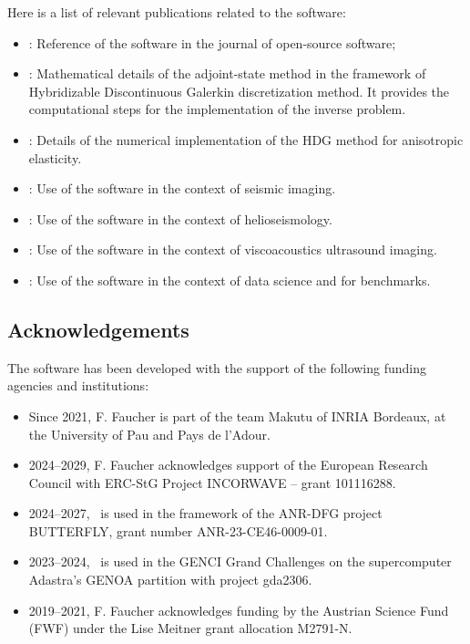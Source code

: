 Here is a list of relevant publications related to the software:
\begin{itemize}
\item \cite{faucher_hawen_2021}: Reference of the software in the journal of open-source software;
\item \cite{Faucher2020adjoint}:
      Mathematical details of the adjoint-state method in the framework 
      of Hybridizable Discontinuous Galerkin discretization method.
      It provides the computational steps for the implementation of the 
      inverse problem.
\item \cite{pham_numerical_2024}: Details of the numerical implementation 
      of the HDG method for anisotropic elasticity.
\item \cite{Faucher2019FRgWIGeo,Faucher2020DAS}: 
      Use of the software in the context of seismic imaging.
\item \cite{Pham2020Siam,pham_assembling_2024}:
      Use of the software in the context of helioseismology.
\item \cite{Faucher2023viscoacoustic}: 
      Use of the software in the context of viscoacoustics ultrasound imaging.
\item \cite{Liu2024,Benitez2024}: 
      Use of the software in the context of data science and
      for benchmarks.
\end{itemize}


\subsection{Acknowledgements}
\label{sec::Hawen:acknowledgements}

The software has been developed with the support of the following funding agencies and institutions: 

\begin{itemize}
  \item Since 2021, F. Faucher is part of the team Makutu of INRIA Bordeaux, at the 
                    University of Pau and Pays de l'Adour.
  \item 2024--2029, F. Faucher acknowledges support of the European Research Council 
                    with ERC-StG Project INCORWAVE -- grant 101116288.
  \item 2024--2027, \hawen~is used in the framework of the ANR-DFG project BUTTERFLY,
                     grant number ANR-23-CE46-0009-01.
  \item 2023--2024, \hawen~is used in the GENCI Grand Challenges 
                    on the supercomputer Adastra’s GENOA partition 
                    with project gda2306.
  \item 2019--2021, F. Faucher acknowledges funding by the Austrian Science Fund (FWF) 
        under the Lise Meitner grant allocation M2791-N.
\end{itemize}


